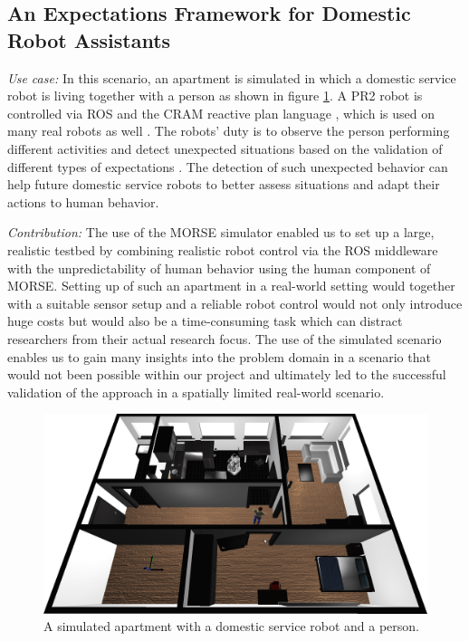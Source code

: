 \documentclass[conference]{IEEEtran}
\begin{document}
\subsection{An Expectations Framework for Domestic Robot Assistants}
\label{sc:expectations}

\emph{Use case:} In this scenario, an apartment is simulated in which a domestic 
service robot is living together with a person as shown in figure \ref{fig|apartment}. 
A PR2 robot is controlled via ROS and the CRAM reactive plan language \cite{beetz2010cram}, 
which is used on many real robots as well \cite{pancakes11humanoids}. The robots' 
duty is to observe the person performing different activities and detect unexpected 
situations based on the validation of different types of expectations \cite{Karg2013}. 
The detection of such unexpected behavior can help future domestic service robots 
to better assess situations and adapt their actions to human behavior. 

\emph{Contribution:} The use of the MORSE simulator enabled us to set up a large, 
realistic testbed by combining realistic robot control via the ROS middleware with the
unpredictability of human behavior using the human component of MORSE. Setting
up of such an apartment in a real-world setting would together with a suitable
sensor setup and a reliable robot control would not only introduce huge costs
but would also be a time-consuming task which can distract researchers from
their actual research focus. The use of the simulated scenario enables us to
gain many insights into the problem domain in a scenario that would not been
possible within our project and ultimately led to the successful validation of
the approach in a spatially limited real-world scenario.

\begin{figure}[H]
      \centering
      \includegraphics[width=0.9\linewidth]{morse_apartment.png}
      \caption{A simulated apartment with a domestic service robot and a person.}
      \label{fig|apartment}
\end{figure}
\end{document}
